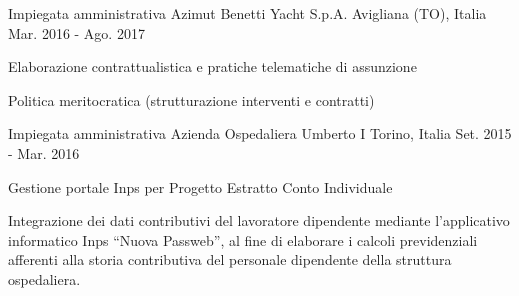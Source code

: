 \begin{cventries}
%
  \cventry
	{Impiegata amministrativa} %
	{Azimut Benetti Yacht S.p.A.} %
	{Avigliana (TO), Italia} %
	{Mar. 2016 - Ago. 2017} %
	{
	  \begin{cvitems}
		\item {Elaborazione contrattualistica e pratiche telematiche di assunzione}
		\item {Politica meritocratica (strutturazione interventi e contratti)}
	  \end{cvitems}
	}


\cventry
{Impiegata amministrativa} %
{Azienda Ospedaliera Umberto I} %
{Torino, Italia} %
{Set. 2015 - Mar. 2016} %
{ %
	\begin{cvitems}
		\item {Gestione portale Inps per Progetto Estratto Conto Individuale}
		\item {Integrazione dei dati contributivi del lavoratore dipendente mediante l'applicativo informatico Inps “Nuova Passweb”, al fine di elaborare i calcoli previdenziali afferenti alla storia contributiva del personale dipendente della struttura ospedaliera.}
	\end{cvitems}
}


\end{cventries}